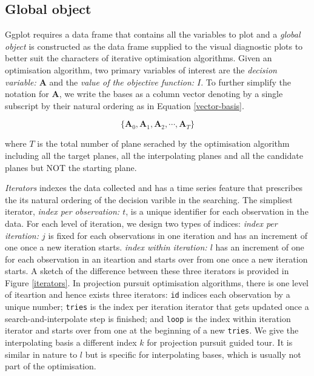 \documentclass[12pt]{article}
\begin{document}
\hypertarget{global-object}{%
\subsection{Global object}\label{global-object}}

Ggplot requires a data frame that contains all the variables to plot and
a \emph{global object} is constructed as the data frame supplied to the
visual diagnostic plots to better suit the characters of iterative
optimisation algorithms. Given an optimisation algorithm, two primary
variables of interest are the \emph{decision variable: \(\mathbf{A}\)}
and the \emph{value of the objective function: \(I\)}. To further
simplify the notation for \(\mathbf{A}\), we write the bases as a column
vector denoting by a single subscript by their natural ordering as in
Equation \ref{vector-basis}.

\begin{equation}
\{
\mathbf{A}_0, 
\mathbf{A}_1, 
\mathbf{A}_2, 
\cdots,
\mathbf{A}_T
\label{vector-basis}
\}
\end{equation}

where \(T\) is the total number of plane serached by the optimisation
algorithm including all the target planes, all the interpolating planes
and all the candidate planes but NOT the starting plane.

\emph{Iterators} indexes the data collected and has a time series
feature that prescribes the its natural ordering of the decision varible
in the searching. The simpliest iterator, \emph{index per observation:
\(t\)}, is a unique identifier for each observation in the data. For
each level of iteration, we design two types of indices: \emph{index per
iteration: \(j\)} is fixed for each observations in one iteration and
has an increment of one once a new iteration starts. \emph{index within
iteration: \(l\)} has an increment of one for each observation in an
iteartion and starts over from one once a new iteration starts. A sketch
of the difference between these three iterators is provided in Figure
\ref{iterators}. In projection pursuit optimisation algorithms, there is
one level of iteartion and hence exists three iterators: \texttt{id}
indices each observation by a unique number; \texttt{tries} is the index
per iteration iterator that gets updated once a search-and-interpolate
step is finished; and \texttt{loop} is the index within iteration
iterator and starts over from one at the beginning of a new
\texttt{tries}. We give the interpolating basis a different index \(k\)
for projection pursuit guided tour. It is similar in nature to \(l\) but
is specific for interpolating bases, which is usually not part of the
optimisation.
\end{document}

